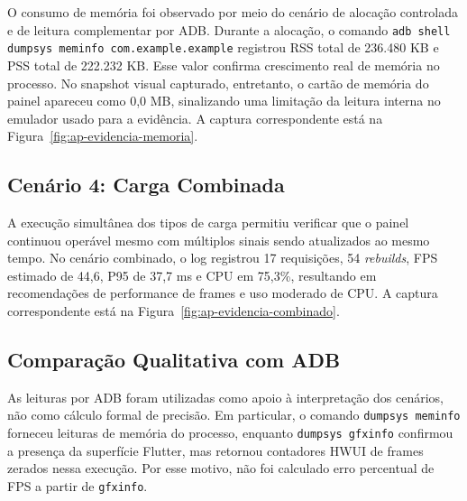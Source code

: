O consumo de memória foi observado por meio do cenário de alocação controlada e de leitura complementar por ADB. Durante a alocação, o comando \texttt{adb shell dumpsys meminfo com.example.example} registrou RSS total de 236.480 KB e PSS total de 222.232 KB. Esse valor confirma crescimento real de memória no processo. No snapshot visual capturado, entretanto, o cartão de memória do painel apareceu como 0{,}0 MB, sinalizando uma limitação da leitura interna no emulador usado para a evidência. A captura correspondente está na Figura~\ref{fig:ap-evidencia-memoria}.

\subsection{Cenário 4: Carga Combinada}

A execução simultânea dos tipos de carga permitiu verificar que o painel continuou operável mesmo com múltiplos sinais sendo atualizados ao mesmo tempo. No cenário combinado, o log registrou 17 requisições, 54 \textit{rebuilds}, FPS estimado de 44{,}6, P95 de 37{,}7 ms e CPU em 75{,}3\%, resultando em recomendações de performance de frames e uso moderado de CPU. A captura correspondente está na Figura~\ref{fig:ap-evidencia-combinado}.

\subsection{Comparação Qualitativa com ADB}

As leituras por ADB foram utilizadas como apoio à interpretação dos cenários, não como cálculo formal de precisão. Em particular, o comando \texttt{dumpsys meminfo} forneceu leituras de memória do processo, enquanto \texttt{dumpsys gfxinfo} confirmou a presença da superfície Flutter, mas retornou contadores HWUI de frames zerados nessa execução. Por esse motivo, não foi calculado erro percentual de FPS a partir de \texttt{gfxinfo}.

